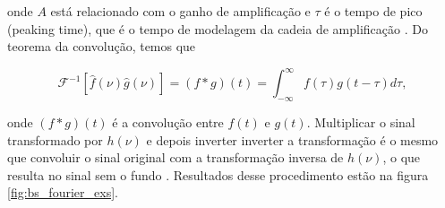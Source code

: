 \documentclass[a4paper,12pt,oneside]{book}
\DeclareMathOperator{\sinc}{sinc}
\DeclareMathOperator{\rect}{rect}
\begin{document}
\par onde $A$ está relacionado com o ganho de amplificação e $\tau$ é o tempo de pico (peaking time), que é o tempo de modelagem da cadeia de amplificação \cite{GET}. Do teorema da convolução, temos que \cite{metodos_mat_aplicada}


\begin{equation}
    \mathscr{F}^{-1}[\hat{f}(\nu) \hat{g}(\nu)]=(f * g)(t)=\int_{-\infty}^{\infty} f(\tau) g(t-\tau) d \tau, 
\end{equation}

\par onde $(f * g)(t)$ é a convolução entre $f(t)$ e $g(t)$. Multiplicar o sinal transformado por $h(\nu)$ e depois inverter inverter a transformação é o mesmo que convoluir o sinal original com a transformação inversa de $h(\nu)$, o que resulta no sinal sem o fundo \cite{josh_bradt, GET}. Resultados desse procedimento estão na figura \ref{fig:bs_fourier_exs}.


%
\end{document}
